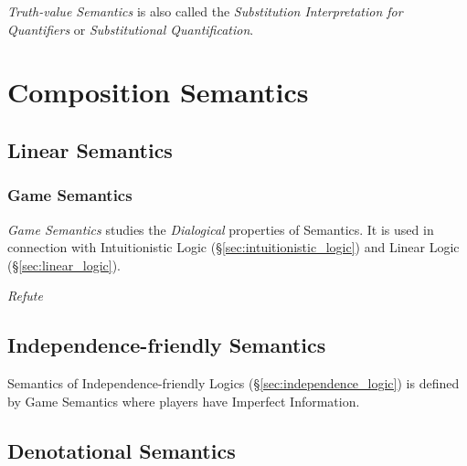 \emph{Truth-value Semantics} is also called the \emph{Substitution
  Interpretation for Quantifiers} or \emph{Substitutional
  Quantification}.



\section{Composition Semantics}\label{sec:composition_semantics}

\subsection{Linear Semantics}\label{sec:linear_semantics}

\subsubsection{Game Semantics}\label{sec:game_semantics}

\emph{Game Semantics} studies the \emph{Dialogical} properties of
Semantics. It is used in connection with Intuitionistic Logic
(\S\ref{sec:intuitionistic_logic}) and Linear Logic
(\S\ref{sec:linear_logic}).

\emph{Refute}



\subsection{Independence-friendly Semantics}
\label{sec:independence_semantics}

Semantics of Independence-friendly Logics
(\S\ref{sec:independence_logic}) is defined by Game Semantics where
players have Imperfect Information.



\subsection{Denotational Semantics}\label{sec:denotational_semantics}

